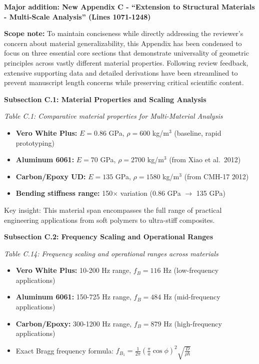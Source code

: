 \documentclass[11pt,a4paper]{article}
\newenvironment{changesbox}{%
    \par\medskip\noindent{\color{changescolor}\rule{\linewidth}{2pt}}\par
    \noindent{\color{changescolor}\bfseries Manuscript Changes}\par\smallskip
}{%
    \par\noindent{\color{changescolor}\rule{\linewidth}{0.5pt}}\medskip
}
\begin{document}
\begin{changesbox}
\textbf{Major addition: New Appendix C - ``Extension to Structural Materials - Multi-Scale Analysis'' (Lines 1071-1248)}

\textbf{Scope note:} To maintain conciseness while directly addressing the reviewer's concern about material generalizability, this Appendix has been condensed to focus on three essential core sections that demonstrate universality of geometric principles across vastly different material properties. Following review feedback, extensive supporting data and detailed derivations have been streamlined to prevent manuscript length concerns while preserving critical scientific content.

\textbf{Subsection C.1: Material Properties and Scaling Analysis}

\textit{Table C.1: Comparative material properties for Multi-Material Analysis}
\begin{itemize}
    \item \textbf{Vero White Plus:} $E = 0.86$ GPa, $\rho = 600$ kg/m$^3$ (baseline, rapid prototyping)
    \item \textbf{Aluminum 6061:} $E = 70$ GPa, $\rho = 2700$ kg/m$^3$ (from Xiao et al.~2012)
    \item \textbf{Carbon/Epoxy UD:} $E = 135$ GPa, $\rho = 1580$ kg/m$^3$ (from CMH-17 2012)
    \item \textbf{Bending stiffness range:} 150$\times$ variation (0.86 GPa $\to$ 135 GPa)
\end{itemize}

Key insight: This material span encompasses the full range of practical engineering applications from soft polymers to ultra-stiff composites.

\textbf{Subsection C.2: Frequency Scaling and Operational Ranges}

\textit{Table C.14: Frequency scaling and operational ranges across materials}
\begin{itemize}
    \item \textbf{Vero White Plus:} 10-200 Hz range, $f_B = 116$ Hz (low-frequency applications)
    \item \textbf{Aluminum 6061:} 150-725 Hz range, $f_B = 484$ Hz (mid-frequency applications)
    \item \textbf{Carbon/Epoxy:} 300-1200 Hz range, $f_B = 879$ Hz (high-frequency applications)
    \item Exact Bragg frequency formula: $f_{B_1} = \frac{1}{2\pi}\left(\frac{\pi}{a}\cos\phi\right)^2 \sqrt{\frac{D}{\rho h}}$
\end{itemize}


\end{changesbox}
\end{document}
